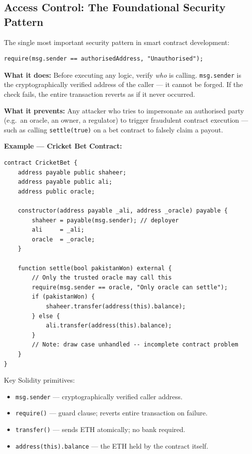 \documentclass[12pt, a4paper]{article}
\begin{document}
\subsection{Access Control: The Foundational Security Pattern}

The single most important security pattern in smart contract development:

\begin{lstlisting}[language=Solidity, basicstyle=\ttfamily\small,
                   keywordstyle=\color{blue}, commentstyle=\color{gray}]
require(msg.sender == authorisedAddress, "Unauthorised");
\end{lstlisting}

\textbf{What it does:} Before executing any logic, verify \emph{who} is calling.
\texttt{msg.sender} is the cryptographically verified address of the caller ---
it cannot be forged. If the check fails, the entire transaction reverts as if it
never occurred.

\textbf{What it prevents:} Any attacker who tries to impersonate an authorised
party (e.g.\ an oracle, an owner, a regulator) to trigger fraudulent contract
execution --- such as calling \texttt{settle(true)} on a bet contract to falsely
claim a payout.

\textbf{Example --- Cricket Bet Contract:}

\begin{lstlisting}[language=Solidity, basicstyle=\ttfamily\small,
                   keywordstyle=\color{blue}, commentstyle=\color{gray}]
contract CricketBet {
    address payable public shaheer;
    address payable public ali;
    address public oracle;

    constructor(address payable _ali, address _oracle) payable {
        shaheer = payable(msg.sender); // deployer
        ali     = _ali;
        oracle  = _oracle;
    }

    function settle(bool pakistanWon) external {
        // Only the trusted oracle may call this
        require(msg.sender == oracle, "Only oracle can settle");
        if (pakistanWon) {
            shaheer.transfer(address(this).balance);
        } else {
            ali.transfer(address(this).balance);
        }
        // Note: draw case unhandled -- incomplete contract problem
    }
}
\end{lstlisting}

Key Solidity primitives:
\begin{itemize}
    \item \texttt{msg.sender} --- cryptographically verified caller address.
    \item \texttt{require()} --- guard clause; reverts entire transaction on failure.
    \item \texttt{transfer()} --- sends ETH atomically; no bank required.
    \item \texttt{address(this).balance} --- the ETH held by the contract itself.
\end{itemize}
\end{document}
